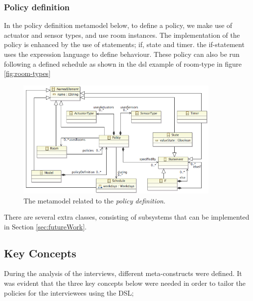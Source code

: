 \subsubsection{Policy definition}
In the policy definition metamodel below, to define a policy, we make use of actuator and sensor types, and use room instances. The implementation of the policy is enhanced by the use of statements; if, state and timer. the if-statement uses the expression language to define behaviour. These policy can also be run following a defined schedule as shown in the dsl example of room-type in figure \ref{fig:room-types} 
\begin{figure}[h]
  \centering
    \includegraphics[width=10cm]{ecore-policy-definition.png}	
	\caption{The metamodel related to the \textit{policy definition}.}
	\label{fig:ecore-policy-definition}
\end{figure}

There are several extra classes, consisting of subsystems that can be implemented in Section \ref{sec:futureWork}.

\subsection{Key Concepts}

During the analysis of the interviews, different meta-constructs were defined. It was evident that the three key concepts below were needed in order to tailor the policies for the interviewees using the DSL;


